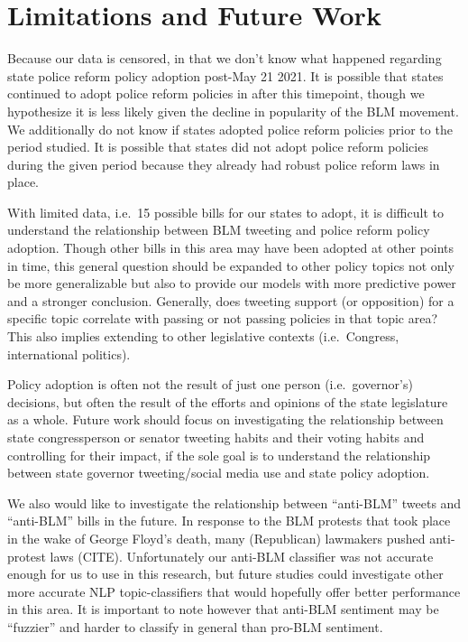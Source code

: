 \documentclass[12pt]{article}
\begin{document}
\hypertarget{limitations-and-future-work}{%
\section{Limitations and Future
Work}\label{limitations-and-future-work}}

Because our data is censored, in that we don't know what happened
regarding state police reform policy adoption post-May 21 2021. It is
possible that states continued to adopt police reform policies in after
this timepoint, though we hypothesize it is less likely given the
decline in popularity of the BLM movement. We additionally do not know
if states adopted police reform policies prior to the period studied. It
is possible that states did not adopt police reform policies during the
given period because they already had robust police reform laws in
place.

With limited data, i.e.~15 possible bills for our states to adopt, it is
difficult to understand the relationship between BLM tweeting and police
reform policy adoption. Though other bills in this area may have been
adopted at other points in time, this general question should be
expanded to other policy topics not only be more generalizable but also
to provide our models with more predictive power and a stronger
conclusion. Generally, does tweeting support (or opposition) for a
specific topic correlate with passing or not passing policies in that
topic area? This also implies extending to other legislative contexts
(i.e.~Congress, international politics).

Policy adoption is often not the result of just one person
(i.e.~governor's) decisions, but often the result of the efforts and
opinions of the state legislature as a whole. Future work should focus
on investigating the relationship between state congressperson or
senator tweeting habits and their voting habits and controlling for
their impact, if the sole goal is to understand the relationship between
state governor tweeting/social media use and state policy adoption.

We also would like to investigate the relationship between ``anti-BLM''
tweets and ``anti-BLM'' bills in the future. In response to the BLM
protests that took place in the wake of George Floyd's death, many
(Republican) lawmakers pushed anti-protest laws (CITE). Unfortunately
our anti-BLM classifier was not accurate enough for us to use in this
research, but future studies could investigate other more accurate NLP
topic-classifiers that would hopefully offer better performance in this
area. It is important to note however that anti-BLM sentiment may be
``fuzzier'' and harder to classify in general than pro-BLM sentiment.
\end{document}
